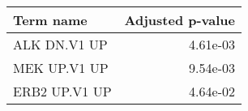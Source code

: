 \begin{tabular}{lr}
\toprule
    Term name &  Adjusted p-value \\
\midrule
 ALK DN.V1 UP &          4.61e-03 \\
 MEK UP.V1 UP &          9.54e-03 \\
ERB2 UP.V1 UP &          4.64e-02 \\
\bottomrule
\end{tabular}
